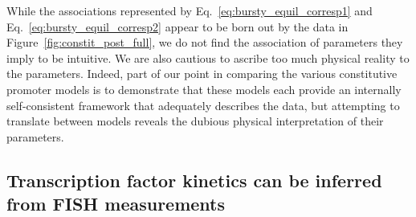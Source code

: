 While the associations represented by
Eq.~\ref{eq:bursty_equil_corresp1} and Eq.~\ref{eq:bursty_equil_corresp2}
appear to be born out by the data in Figure~\ref{fig:constit_post_full},
we do not find the association of parameters they imply to be intuitive.
We are also cautious to ascribe too much physical reality to the parameters.
Indeed, part of our point in comparing the various constitutive
promoter models is to demonstrate that these models each provide
an internally self-consistent framework that adequately describes
the data, but attempting to translate between models reveals
the dubious physical interpretation of their parameters.


\subsection{Transcription factor kinetics can be inferred from FISH measurements}
\label{sec:rep_kinetics_inference}


